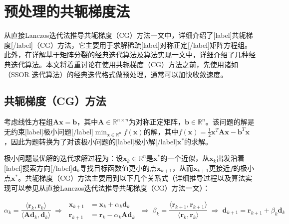 \documentclass[12pt, UTF8, nofonts]{ctexart}
\begin{document}

\section*{预处理的共轭梯度法}

从直接Lanczos迭代法推导共轭梯度（CG）方法一文中，详细介绍了[label]共轭梯度[/label]（CG）方法，它主要用于求解稀疏[label]对称正定[/label]矩阵方程组。此外，在详解基于矩阵分裂的经典迭代算法及算法实现一文中，详细介绍了几种经典迭代算法。本文将着重讨论在使用共轭梯度（CG）方法之前，先使用诸如（SSOR 迭代算法）的经典迭代格式做预处理，通常可以加快收敛速度。

\subsection*{共轭梯度（CG）方法}

考虑线性方程组$\boldsymbol{Ax}=\boldsymbol{b}$，其中$\boldsymbol{A}\in\mathbb{R}^{n \times n}$为对称正定矩阵，$\boldsymbol{b}\in\mathbb{R}^{n}$。该问题的解是无约束[label]极小问题[/label]$\min_{\boldsymbol{x}\in\mathbb{R}^n}f(\boldsymbol{x})$的解，其中$f(\boldsymbol{x})=\frac{1}{2}\boldsymbol{x}^T\boldsymbol{Ax}-\boldsymbol{b}^T\boldsymbol{x}$，因此为题转换为了对该极小问题的[label]极小解[/label]$\boldsymbol{x}^{\ast}$的求解。

极小问题最优解的迭代求解过程为：设$\boldsymbol{x}_{k}\in\mathbb{R}^{n}$是$\boldsymbol{x}^{\ast}$的一个近似，从$\boldsymbol{x}_k$出发沿着[label]搜索方向[/label]$\boldsymbol{d}_k$寻找目标函数值更小的点$\boldsymbol{x}_{k+1}$，从而$\boldsymbol{x}_{k+1}$更接近$f$的极小点$\boldsymbol{x}^{\ast}$。共轭梯度（CG）方法主要用到以下几个关系式（详细推导过程以及算法实现可以参见从直接Lanczos迭代法推导共轭梯度（CG）方法一文）：

\begin{equation}
    \label{eq:cgrelations}
    \alpha_k = \dfrac{\langle \boldsymbol{r}_k, \boldsymbol{r}_k \rangle}{\langle \boldsymbol{Ad}_k, \boldsymbol{d}_k \rangle}
    \; \Rightarrow \; \begin{aligned}
        \boldsymbol{x}_{k+1} &= \boldsymbol{x}_{k}+\alpha_k\boldsymbol{d}_k \\
        \boldsymbol{r}_{k+1} &= \boldsymbol{r}_{k}-\alpha_k\boldsymbol{Ad}_k
    \end{aligned} \; \Rightarrow \;
    \beta_k = \dfrac{\langle \boldsymbol{r}_{k+1},\boldsymbol{r}_{k+1} \rangle}{\langle \boldsymbol{r}_k,\boldsymbol{r}_k \rangle}
    \; \Rightarrow \;
    \boldsymbol{d}_{k+1} = \boldsymbol{r}_{k+1} + \beta_k\boldsymbol{d}_k
\end{equation}
\end{document}
